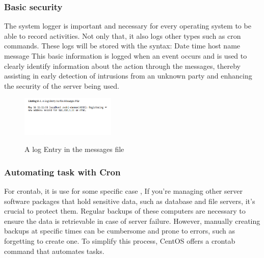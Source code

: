 \documentclass[10pt]{article}
\begin{document}
\subsubsection*{Basic security}
The system logger is important and necessary for every operating system to be able to record activities. Not only that, it also logs other types such as cron commands. These logs will be stored with the syntax: 
\newline\newline 
Date time host name message
\newline\newline 
This basic information is logged when an event occurs and is used to clearly identify information about the action through the messages, thereby assisting in early detection of intrusions from an unknown party and enhancing the security of the server being used.
\cite{FoCL}

\begin{figure}[!htbp]
    \centering
    \includegraphics[width=0.4\textwidth]{./research_example/Screenshot 2023-04-26 220656.png}
    \begin{description}
        \item[] 
    \end{description}
    \caption{A log Entry in the messages file}
    \label{fig:description}
\end{figure}

\subsubsection{Automating task with Cron}
For crontab, it is use for some specific case , If you're managing other server software packages that hold sensitive data, such as database and file servers, it's crucial to protect them. Regular backups of these computers are necessary to ensure the data is retrievable in case of server failure. However, manually creating backups at specific times can be cumbersome and prone to errors, such as forgetting to create one. To simplify this process, CentOS offers a crontab command that automates tasks.
\cite{FoCL}
\end{document}
